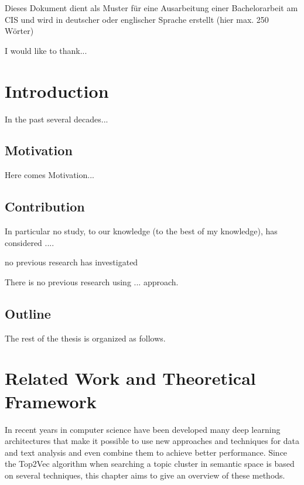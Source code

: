\documentclass[fontsize=12pt,a4paper,twoside,openany]{scrbook}
\begin{document}
\deckblatt
\pagestyle{scrheadings}

\erklaerung

\thispagestyle{scrplain}
\noindent
Dieses Dokument dient als Muster für eine Ausarbeitung einer
Bachelorarbeit am CIS und wird in deutscher oder englischer Sprache
erstellt (hier max. 250 Wörter)

\thispagestyle{scrplain}
I would like to thank...

\tableofcontents

\chapter{Introduction}
In the past several decades...


\section{Motivation}
Here comes Motivation...

\section{Contribution}

In particular no study, to our knowledge (to the best of my knowledge), has considered ....


no previous research has investigated

There is no previous research using ... approach.

\section{Outline}
The rest of the thesis is organized as follows.


\chapter{Related Work and Theoretical Framework}
\label{chapter:theory}
In recent years in computer science have been developed many deep learning architectures that make it possible to use new approaches and techniques for data and text analysis \parencite{Minaee20} and even combine them to achieve better performance. Since the Top2Vec algorithm when searching a topic cluster in semantic space is based on several techniques, this chapter aims to give an overview of these methods. 
\end{document}

